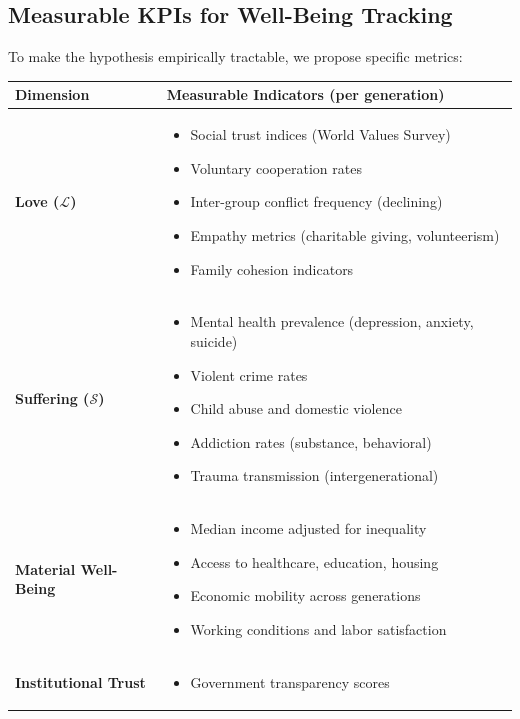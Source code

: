 \documentclass[11pt,a4paper]{article}
\theoremstyle{definition}
\theoremstyle{remark}
\begin{document}
\subsection{Measurable KPIs for Well-Being Tracking}

To make the hypothesis empirically tractable, we propose specific metrics:

\begin{table}[h]
\centering
\small
\begin{tabular}{|l|p{8cm}|}
\hline
\textbf{Dimension} & \textbf{Measurable Indicators (per generation)} \\
\hline
\textbf{Love ($\mathcal{L}$)} & 
\begin{itemize}[nosep,leftmargin=*]
\item Social trust indices (World Values Survey)
\item Voluntary cooperation rates
\item Inter-group conflict frequency (declining)
\item Empathy metrics (charitable giving, volunteerism)
\item Family cohesion indicators
\end{itemize} \\
\hline
\textbf{Suffering ($\mathcal{S}$)} & 
\begin{itemize}[nosep,leftmargin=*]
\item Mental health prevalence (depression, anxiety, suicide)
\item Violent crime rates
\item Child abuse and domestic violence
\item Addiction rates (substance, behavioral)
\item Trauma transmission (intergenerational)
\end{itemize} \\
\hline
\textbf{Material Well-Being} & 
\begin{itemize}[nosep,leftmargin=*]
\item Median income adjusted for inequality
\item Access to healthcare, education, housing
\item Economic mobility across generations
\item Working conditions and labor satisfaction
\end{itemize} \\
\hline
\textbf{Institutional Trust} & 
\begin{itemize}[nosep,leftmargin=*]
\item Government transparency scores

\end{itemize}
\end{tabular}
\end{table}
\end{document}
